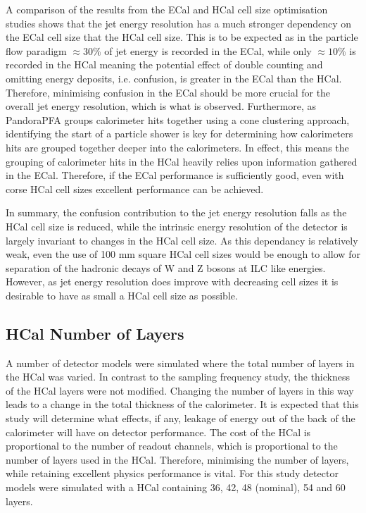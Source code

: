 A comparison of the results from the ECal and HCal cell size optimisation studies shows that the jet energy resolution has a much stronger dependency on the ECal cell size that the HCal cell size.  This is to be expected as in the particle flow paradigm $\approx 30\%$ of jet energy is recorded in the ECal, while only $\approx 10\%$ is recorded in the HCal meaning the potential effect of double counting and omitting energy deposits, i.e. confusion, is greater in the ECal than the HCal.  Therefore, minimising confusion in the ECal should be more crucial for the overall jet energy resolution, which is what is observed.  Furthermore, as PandoraPFA groups calorimeter hits together using a cone clustering approach, identifying the start of a particle shower is key for determining how calorimeters hits are grouped together deeper into the calorimeters.  In effect, this means the grouping of calorimeter hits in the HCal heavily relies upon information gathered in the ECal.  Therefore, if the ECal performance is sufficiently good, even with corse HCal cell sizes excellent performance can be achieved.  

In summary, the confusion contribution to the jet energy resolution falls as the HCal cell size is reduced, while the intrinsic energy resolution of the detector is largely invariant to changes in the HCal cell size.  As this dependancy is relatively weak, even the use of 100 mm square HCal cell sizes would be enough to allow for separation of the hadronic decays of W and Z bosons at ILC like energies.  However, as jet energy resolution does improve with decreasing cell sizes it is desirable to have as small a HCal cell size as possible.


\subsection{HCal Number of Layers}
\label{sec:hcalnlayers}
A number of detector models were simulated where the total number of layers in the HCal was varied.  In contrast to the sampling frequency study, the thickness of the HCal layers were not modified.  Changing the number of layers in this way leads to a change in the total thickness of the calorimeter.  It is expected that this study will determine what effects, if any, leakage of energy out of the back of the calorimeter will have on detector performance.  The cost of the HCal is proportional to the number of readout channels, which is proportional to the number of layers used in the HCal.  Therefore, minimising the number of layers, while retaining excellent physics performance is vital.  For this study detector models were simulated with a HCal containing 36, 42, 48 (nominal), 54 and 60 layers. 

